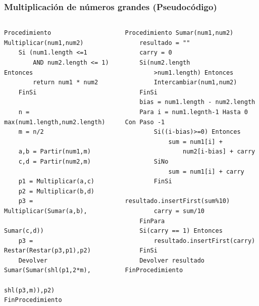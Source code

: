 \documentclass[10pt]{beamer}
\begin{document}
    \begin{frame}[fragile]
        \frametitle{Multiplicación de números grandes (Pseudocódigo)}
        \begin{columns}
            \begin{column}{0.50\textwidth}
               \begin{lstlisting}[basicstyle=\ttfamily\scriptsize]
Procedimiento Multiplicar(num1,num2)
    Si (num1.length <=1 
        AND num2.length <= 1) Entonces
        return num1 * num2
    FinSi

    n = max(num1.length,num2.length)
    m = n/2
    
    a,b = Partir(num1,m)
    c,d = Partir(num2,m)

    p1 = Multiplicar(a,c)
    p2 = Multiplicar(b,d)
    p3 = Multiplicar(Sumar(a,b),
                    Sumar(c,d))
    p3 = Restar(Restar(p3,p1),p2)
    Devolver Sumar(Sumar(shl(p1,2*m),
                    shl(p3,m)),p2)
FinProcedimiento
               \end{lstlisting} 
            \end{column}
            \begin{column}{0.50\textwidth}
                \begin{lstlisting}[basicstyle=\ttfamily\scriptsize]
Procedimiento Sumar(num1,num2)
    resultado = ""
    carry = 0
    Si(num2.length
        >num1.length) Entonces
        Intercambiar(num1,num2)
    FinSi
    bias = num1.length - num2.length
    Para i = num1.legnth-1 Hasta 0 Con Paso -1
        Si((i-bias)>=0) Entonces
            sum = num1[i] + 
                num2[i-bias] + carry
        SiNo
            sum = num1[i] + carry
        FinSi
        resultado.insertFirst(sum%10)
        carry = sum/10
    FinPara
    Si(carry == 1) Entonces
        resultado.insertFirst(carry)
    FinSi
    Devolver resultado
FinProcedimiento
               \end{lstlisting} 
            \end{column}
         \end{columns}
    \end{frame}
\end{document}
